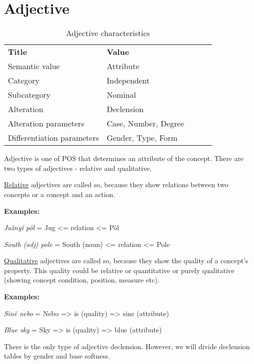 \section{Adjective}

\begin{table}[h]
	\caption{Adjective characteristics}
	\begin{tabular}{lllll}
		\textbf{Title}              & \textbf{Value}               \\
		Semantic value              & Attribute                    \\
		Category                    & Independent                  \\
		Subcategory                 & Nominal                      \\
		Alteration                  & Declension                   \\
		Alteration parameters       & Case, Number, Degree \\
		Differentiation parameters  & Gender, Type, Form
	\end{tabular}
\end{table}

Adjective is one of POS that determines an attribute of the concept. There are two types of adjectives - relative and qualitative. 

\underline{Relative} adjectives are called so, because they show relations between two concepts or a concept and an action.

\textbf{Examples:}

\textit{Južnyǐ pôl} = Jug <= relation <= Pôl

\textit{South (adj) pole} = South (noun) <= relation <= Pole

\underline{Qualitative} adjectives are called so, because they show the quality of a concept’s property. This quality could be relative or quantitative or purely qualitative (showing concept condition, position, measure etc).

\textbf{Examples:}

\textit{Sinë nebo} = Nebo => is (quality) => sine (attribute) 

\textit{Blue sky} = Sky => is (quality) => blue (attribute)

There is the only type of adjective declension. However, we will divide declension tables by gender and base softness.

